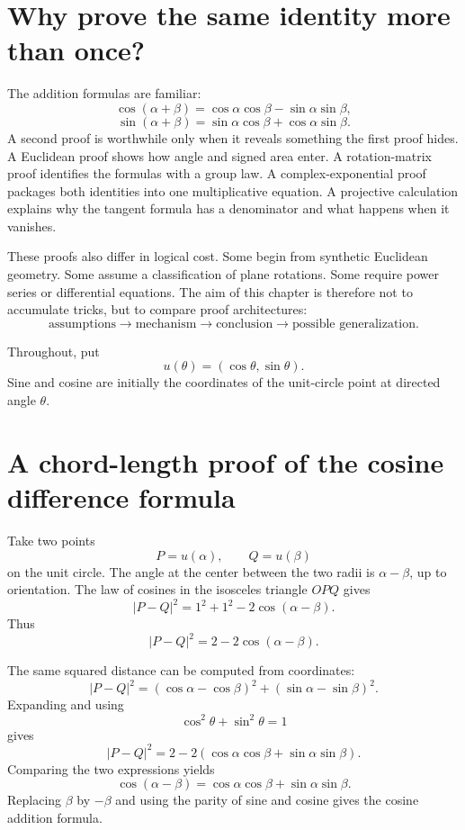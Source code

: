 
\section{Why prove the same identity more than once?}

The addition formulas are familiar:
\[
  \cos(\alpha+\beta)
  =\cos\alpha\cos\beta-\sin\alpha\sin\beta,
\]
\[
  \sin(\alpha+\beta)
  =\sin\alpha\cos\beta+\cos\alpha\sin\beta.
\]
A second proof is worthwhile only when it reveals something the first proof hides.  A Euclidean proof shows how angle and signed area enter.  A rotation-matrix proof identifies the formulas with a group law.  A complex-exponential proof packages both identities into one multiplicative equation.  A projective calculation explains why the tangent formula has a denominator and what happens when it vanishes.

These proofs also differ in logical cost.  Some begin from synthetic Euclidean geometry.  Some assume a classification of plane rotations.  Some require power series or differential equations.  The aim of this chapter is therefore not to accumulate tricks, but to compare proof architectures:
\[
  \text{assumptions}
  \longrightarrow
  \text{mechanism}
  \longrightarrow
  \text{conclusion}
  \longrightarrow
  \text{possible generalization}.
\]

Throughout, put
\[
  u(\theta)=(\cos\theta,\sin\theta).
\]
Sine and cosine are initially the coordinates of the unit-circle point at directed angle \(\theta\).

\section{A chord-length proof of the cosine difference formula}

Take two points
\[
  P=u(\alpha),
  \qquad
  Q=u(\beta)
\]
on the unit circle.  The angle at the center between the two radii is \(\alpha-\beta\), up to orientation.  The law of cosines in the isosceles triangle \(OPQ\) gives
\[
  |P-Q|^2
  =1^2+1^2-2\cos(\alpha-\beta).
\]
Thus
\[
  |P-Q|^2=2-2\cos(\alpha-\beta).
\]

The same squared distance can be computed from coordinates:
\[
  |P-Q|^2
  =(\cos\alpha-\cos\beta)^2
   +(\sin\alpha-\sin\beta)^2.
\]
Expanding and using
\[
  \cos^2\theta+\sin^2\theta=1
\]
gives
\[
  |P-Q|^2
  =2-2(\cos\alpha\cos\beta+\sin\alpha\sin\beta).
\]
Comparing the two expressions yields
\[
  \boxed{
  \cos(\alpha-\beta)
  =\cos\alpha\cos\beta+\sin\alpha\sin\beta.}
\]
Replacing \(\beta\) by \(-\beta\) and using the parity of sine and cosine gives the cosine addition formula.

